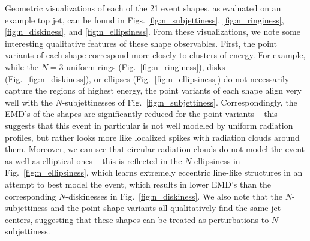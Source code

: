 \documentclass[letterpaper,11pt]{article}
\DeclareRobustCommand{\Fig}[1]{Fig.~\ref{fig:#1}}
\begin{document}
Geometric visualizations of each of the 21 event shapes, as evaluated on an example top jet, can be found in Figs. \ref{fig:n_subjettiness}, \ref{fig:n_ringiness}, \ref{fig:n_diskiness}, and \ref{fig:n_ellipsiness}. From these visualizations, we note some interesting qualitative features of these shape observables. First, the point variants of each shape correspond more closely to clusters of energy.
%
For example, while the $N=3$ uniform rings (\Fig{n_ringiness}), disks (\Fig{n_diskiness}), or ellipses (\Fig{n_ellipsiness}) do not necessarily capture the regions of highest energy, the point variants of each shape align very well with the $N$-subjettinesses of \Fig{n_subjettiness}.
%
Correspondingly, the EMD's of the shapes are significantly reduced for the point variants -- this suggests that this event in particular is not well modeled by uniform radiation profiles, but rather looks more like localized spikes with radiation clouds around them. Moreover, we can see that circular radiation clouds do not model the event as well as elliptical ones -- this is reflected in the $N$-ellipsiness in \Fig{n_ellipsiness}, which learns extremely eccentric line-like structures in an attempt to best model the event, which results in lower EMD's than the corresponding $N$-diskinesses in \Fig{n_diskiness}. We also note that the $N$-subjettiness and the point shape variants all qualitatively find the same jet centers, suggesting that these shapes can be treated as perturbations to $N$-subjettiness.


\begin{figure*}[tp]
    \centering
    \caption{
        The (a) 1-, (b) 2-, and (c) 3-subjettiness of an example top jet event. Subjets are represented by a purple ``$\times$'', with size proportional to the subjet's energy weight. 
        }
    \label{fig:n_subjettiness}
\end{figure*}
\end{document}
